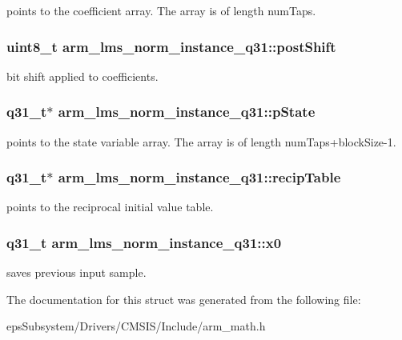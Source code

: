 points to the coefficient array. The array is of length num\-Taps. \hypertarget{structarm__lms__norm__instance__q31_a28d7b9e437817f83397e081967e90f3c}{
\subsubsection[{post\-Shift}]{\setlength{\rightskip}{0pt plus 5cm}uint8\-\_\-t arm\-\_\-lms\-\_\-norm\-\_\-instance\-\_\-q31\-::post\-Shift}}\label{structarm__lms__norm__instance__q31_a28d7b9e437817f83397e081967e90f3c}
bit shift applied to coefficients. \hypertarget{structarm__lms__norm__instance__q31_a6b25c96cf048b77078d62f4252a01ec4}{
\subsubsection[{p\-State}]{\setlength{\rightskip}{0pt plus 5cm}q31\-\_\-t$\ast$ arm\-\_\-lms\-\_\-norm\-\_\-instance\-\_\-q31\-::p\-State}}\label{structarm__lms__norm__instance__q31_a6b25c96cf048b77078d62f4252a01ec4}
points to the state variable array. The array is of length num\-Taps+block\-Size-\/1. \hypertarget{structarm__lms__norm__instance__q31_a85836d0907077b9ac660f7bbbaa9d694}{
\subsubsection[{recip\-Table}]{\setlength{\rightskip}{0pt plus 5cm}q31\-\_\-t$\ast$ arm\-\_\-lms\-\_\-norm\-\_\-instance\-\_\-q31\-::recip\-Table}}\label{structarm__lms__norm__instance__q31_a85836d0907077b9ac660f7bbbaa9d694}
points to the reciprocal initial value table. \hypertarget{structarm__lms__norm__instance__q31_a47c4466d644e0d8ba407995adfa9b917}{
\subsubsection[{x0}]{\setlength{\rightskip}{0pt plus 5cm}q31\-\_\-t arm\-\_\-lms\-\_\-norm\-\_\-instance\-\_\-q31\-::x0}}\label{structarm__lms__norm__instance__q31_a47c4466d644e0d8ba407995adfa9b917}
saves previous input sample. 

The documentation for this struct was generated from the following file\-:\begin{DoxyCompactItemize}
\item 
eps\-Subsystem/\-Drivers/\-C\-M\-S\-I\-S/\-Include/arm\-\_\-math.\-h\end{DoxyCompactItemize}

